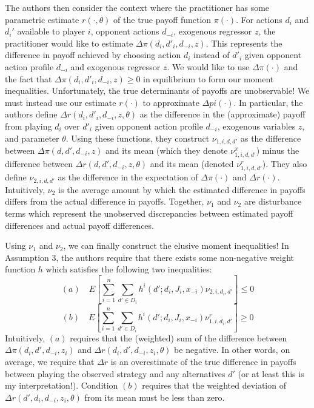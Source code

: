 \documentclass[12pt]{article}
\begin{document}
The authors then consider the context where the practitioner has some parametric estimate $r(\cdot, \theta)$ of the true payoff function $\pi(\cdot)$. For actions $d_i$ and $d_i'$ available to player $i$, opponent actions $d_{-i}$, exogenous regressor $z$, the practitioner would like to estimate $\Delta \pi(d_i, d'_i, d_{-i}, z)$. This represents the difference in payoff achieved by choosing action $d_i$ instead of $d'_i$ given opponent action profile $d_{-i}$ and exogenous regressor $z$. We would like to use $\Delta \pi(\cdot)$ and the fact that $\Delta \pi(d_i, d'_i, d_{-i}, z) \geq 0$ in equilibrium to form our moment inequalities. Unfortunately, the true determinants of payoffs are unobservable! We must instead use our estimate $r(\cdot)$ to approximate $\Delta pi(\cdot)$. In particular, the authors define $\Delta r(d_i, d'_i, d_{-i}, z, \theta)$ as the difference in the (approximate) payoff from playing $d_i$ over $d'_{i}$ given opponent action profile $d_{-i}$, exogenous variables $z$, and parameter $\theta$. Using these functions, they construct $\nu_{1,i,d, d'}$ as the difference between $\Delta \pi(d, d', d_{-i}, z)$ and its mean (which they denote $\nu_{1, i, d, d'}^{\pi}$) minus the difference between $\Delta r(d, d', d_{-i}, z, \theta)$ and its mean (denoted $\nu_{1, i, d, d'}^r$). They also define $\nu_{2, i, d, d'}$ as the difference in the expectation of $\Delta \pi(\cdot)$ and $\Delta r(\cdot)$. Intuitively, $\nu_2$ is the average amount by which the estimated difference in payoffs differs from the actual difference in payoffs. Together, $\nu_1$ and $\nu_2$ are disturbance terms which represent the unobserved discrepancies between estimated payoff differences and actual payoff differences. 

Using $\nu_1$ and $\nu_2$, we can finally construct the elusive moment inequalities! In Assumption 3, the authors require that there exists some non-negative weight function $h$ which satisfies the following two inequalities:
\[(a) \quad E\left[ \sum_{i=1}^n \sum_{d' \in D_i} h^i(d'; d_{i}, J_i, x_{-i}) \nu_{2, i, d_{i}, d'}\right] \leq 0\]
\[(b) \quad E\left[ \sum_{i=1}^n \sum_{d' \in D_i} h^i(d'; d_{i}, J_i, x_{-i}) \nu_{1, i, d_{i}, d'}^r\right] \geq 0\] 
Intuitively, $(a)$ requires that the (weighted) sum of the difference between $\Delta \pi(d_i, d', d_{-i}, z_i)$ and $\Delta r(d_i, d', d_{-i}, z_i, \theta)$ be negative. In other words, on average, we require that $\Delta r$ is an overestimate of the true difference in payoffs between playing the observed strategy and any alternatives $d'$ (or at least this is my interpretation!). Condition $(b)$ requires that the weighted deviation of $\Delta r(d', d_i, d_{-i}, z_i, \theta)$ from its mean must be less than zero. 
\end{document}
